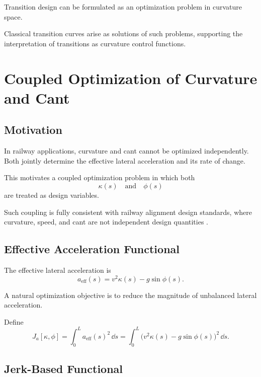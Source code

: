 \begin{summary}
Transition design can be formulated as an optimization problem in
curvature space.

Classical transition curves arise as solutions of such problems,
supporting the interpretation of transitions as curvature control
functions.
\end{summary}

\section{Coupled Optimization of Curvature and Cant}

\subsection{Motivation}

In railway applications, curvature and cant cannot be optimized
independently.
Both jointly determine the effective lateral acceleration and its rate
of change.

This motivates a coupled optimization problem in which both
\[
\kappa(s)
\quad \text{and} \quad
\phi(s)
\]
are treated as design variables.

Such coupling is fully consistent with railway alignment design
standards, where curvature, speed, and cant are not independent design
quantities \cite{EN13803_2017,Klein1998Trassierung}.

\subsection{Effective Acceleration Functional}

\begin{definition}
The effective lateral acceleration is
\[
a_{\mathrm{eff}}(s)
=
v^2 \kappa(s) - g \sin\phi(s).
\]
\end{definition}

A natural optimization objective is to reduce the magnitude of
unbalanced lateral acceleration.

\begin{definition}
Define
\[
J_a[\kappa,\phi]
=
\int_0^L a_{\mathrm{eff}}(s)^2 \,\dd s
=
\int_0^L
\bigl(v^2 \kappa(s) - g \sin\phi(s)\bigr)^2
\,\dd s.
\]
\end{definition}

\subsection{Jerk-Based Functional}

